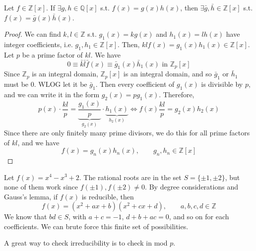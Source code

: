   \begin{lemma}
    Let $f \in \mathbb{Z}[x]$. If $\exists g, h \in \mathbb{Q}[x]$ s.t. $f(x) = g(x) h(x)$, then $\exists \bar{g}, \bar{h} \in \mathbb{Z}[x]$ s.t. $f(x) = \bar{g}(x) \bar{h}(x)$. 
  \end{lemma}
  \begin{proof}
    We can find $k, l \in \mathbb{Z}$ s.t. $g_1 (x) = k g(x)$ and $h_1 (x) = l h(x)$ have integer coefficients, i.e. $g_1, h_1 \in \mathbb{Z}[x]$. Then, $k l f(x) = g_1 (x) h_1 (x) \in \mathbb{Z}[x]$. Let $p$ be a prime factor of $kl$. We have 
    \begin{equation}
      0 \equiv \bar{k} \bar{l} \bar{f} (x) \equiv \bar{g}_1 (x) \bar{h}_1 (x) \text{ in } \mathbb{Z}_p [x]
    \end{equation}
    Since $\mathbb{Z}_p$ is an integral domain, $\mathbb{Z}_p [x]$ is an integral domain, and so $\bar{g}_1$ or $\bar{h}_1$ must be $0$. WLOG let it be $\bar{g}_1$. Then every coefficient of $g_1 (x)$ is divisible by $p$, and we can write it in the form $g_2(x) = p g_1 (x)$. Therefore, 
    \begin{equation}
      p(x) \cdot \frac{kl}{p} = \underbrace{\frac{g_1 (x)}{p}}_{g_2 (x)} \cdot \underbrace{h_1 (x)}_{h_2 (x)} \iff f(x) \frac{kl}{p} = g_2 (x) h_2 (x)
    \end{equation}
    Since there are only finitely many prime divisors, we do this for all prime factors of $kl$, and we have 
    \begin{equation}
      f(x) = g_n (x) h_n (x), \qquad g_n, h_n \in \mathbb{Z}[x]
    \end{equation}
  \end{proof}

  \begin{example}
    Let $f(x) = x^4 - x^3 + 2$. The rational roots are in the set $S = \{\pm 1, \pm2 \}$, but none of them work since $f(\pm1), f(\pm2) \neq 0$. By degree considerations and Gauss's lemma, if $f(x)$ is reducible, then 
    \begin{equation}
      f(x) = (x^2 + ax + b) (x^2 + cx + d), \qquad a, b, c, d \in \mathbb{Z}
    \end{equation}
    We know that $bd \in S$, with $a + c = -1$, $d + b + ac = 0$, and so on for each coefficients. We can brute force this finite set of possibilities. 
  \end{example}

  A great way to check irreducibility is to check in mod $p$. 

